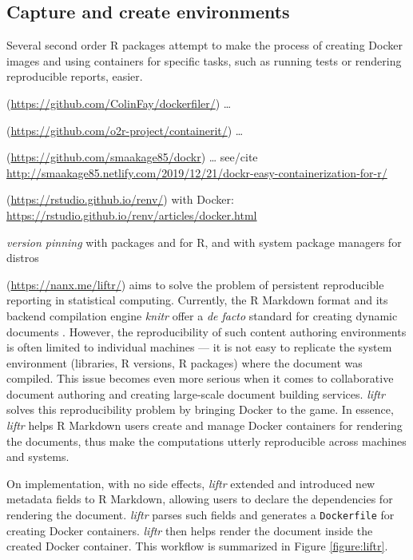 \hypertarget{capture-and-create-environments-nuest}{%
\subsection{\texorpdfstring{Capture and create environments
\citep{nuest}}{Capture and create environments {[}@nuest{]}}}\label{capture-and-create-environments-nuest}}

\label{envs}

Several second order R packages attempt to make the process of creating
Docker images and using containers for specific tasks, such as running
tests or rendering reproducible reports, easier.

\textbf{}
(\url{https://github.com/ColinFay/dockerfiler/}) \ldots{}

\textbf{}
(\url{https://github.com/o2r-project/containerit/}) \ldots{}

\textbf{} (\url{https://github.com/smaakage85/dockr})
\ldots{} see/cite
\url{http://smaakage85.netlify.com/2019/12/21/dockr-easy-containerization-for-r/}

\textbf{} (\url{https://rstudio.github.io/renv/}) with Docker:
\url{https://rstudio.github.io/renv/articles/docker.html}

\emph{version pinning} with packages  and 
for R, and with system package managers for distros

\textbf{} (\url{https://nanx.me/liftr/}) \citep{liftr2019}
aims to solve the problem of persistent reproducible reporting in
statistical computing. Currently, the R Markdown format and its backend
compilation engine \emph{knitr} offer a \emph{de facto} standard for
creating dynamic documents \citep{xie2018}. However, the reproducibility
of such content authoring environments is often limited to individual
machines --- it is not easy to replicate the system environment
(libraries, R versions, R packages) where the document was compiled.
This issue becomes even more serious when it comes to collaborative
document authoring and creating large-scale document building services.
\emph{liftr} solves this reproducibility problem by bringing Docker to
the game. In essence, \emph{liftr} helps R Markdown users create and
manage Docker containers for rendering the documents, thus make the
computations utterly reproducible across machines and systems.

On implementation, with no side effects, \emph{liftr} extended and
introduced new metadata fields to R Markdown, allowing users to declare
the dependencies for rendering the document. \emph{liftr} parses such
fields and generates a \texttt{Dockerfile} for creating Docker
containers. \emph{liftr} then helps render the document inside the
created Docker container. This workflow is summarized in Figure
\ref{figure:liftr}.

